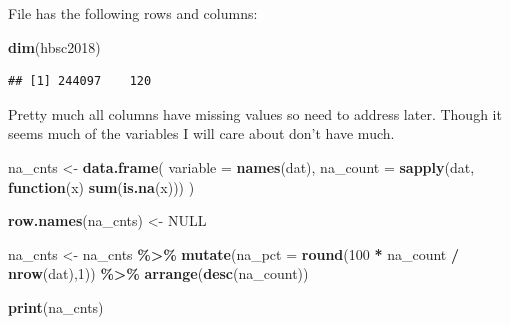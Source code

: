 \documentclass[
]{article}
\newenvironment{Shaded}{\begin{snugshade}}{\end{snugshade}}
\newcommand{\AttributeTok}[1]{\textcolor[rgb]{0.13,0.29,0.53}{#1}}
\newcommand{\ConstantTok}[1]{\textcolor[rgb]{0.56,0.35,0.01}{#1}}
\newcommand{\ControlFlowTok}[1]{\textcolor[rgb]{0.13,0.29,0.53}{\textbf{#1}}}
\newcommand{\DecValTok}[1]{\textcolor[rgb]{0.00,0.00,0.81}{#1}}
\newcommand{\FunctionTok}[1]{\textcolor[rgb]{0.13,0.29,0.53}{\textbf{#1}}}
\newcommand{\NormalTok}[1]{#1}
\newcommand{\OtherTok}[1]{\textcolor[rgb]{0.56,0.35,0.01}{#1}}
\newcommand{\SpecialCharTok}[1]{\textcolor[rgb]{0.81,0.36,0.00}{\textbf{#1}}}
\begin{document}
File has the following rows and columns:

\begin{Shaded}
\begin{Highlighting}[]
\FunctionTok{dim}\NormalTok{(hbsc2018)}
\end{Highlighting}
\end{Shaded}

\begin{verbatim}
## [1] 244097    120
\end{verbatim}

Pretty much all columns have missing values so need to address later.
Though it seems much of the variables I will care about don't have much.

\begin{Shaded}
\begin{Highlighting}[]
\NormalTok{na\_cnts }\OtherTok{\textless{}{-}} \FunctionTok{data.frame}\NormalTok{(}
  \AttributeTok{variable =} \FunctionTok{names}\NormalTok{(dat),}
  \AttributeTok{na\_count =} \FunctionTok{sapply}\NormalTok{(dat, }\ControlFlowTok{function}\NormalTok{(x) }\FunctionTok{sum}\NormalTok{(}\FunctionTok{is.na}\NormalTok{(x)))}
\NormalTok{)}

\FunctionTok{row.names}\NormalTok{(na\_cnts) }\OtherTok{\textless{}{-}} \ConstantTok{NULL}

\NormalTok{na\_cnts }\OtherTok{\textless{}{-}}\NormalTok{ na\_cnts }\SpecialCharTok{\%\textgreater{}\%}
  \FunctionTok{mutate}\NormalTok{(}\AttributeTok{na\_pct =} \FunctionTok{round}\NormalTok{(}\DecValTok{100} \SpecialCharTok{*}\NormalTok{ na\_count }\SpecialCharTok{/} \FunctionTok{nrow}\NormalTok{(dat),}\DecValTok{1}\NormalTok{)) }\SpecialCharTok{\%\textgreater{}\%}
  \FunctionTok{arrange}\NormalTok{(}\FunctionTok{desc}\NormalTok{(na\_count))}

\FunctionTok{print}\NormalTok{(na\_cnts)}
\end{Highlighting}
\end{Shaded}
\end{document}
